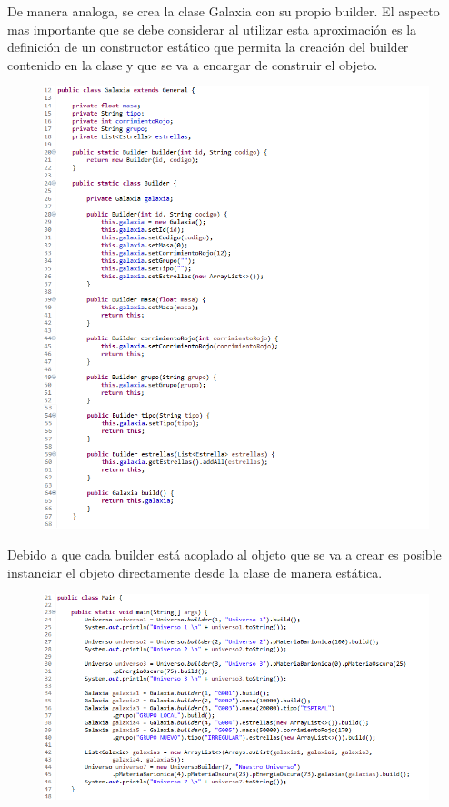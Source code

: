 De manera analoga, se crea la clase Galaxia con su propio builder. El aspecto mas importante que se debe considerar al utilizar esta aproximación es la definición de un constructor estático que permita la creación del builder contenido en la clase y que se va a encargar de construir el objeto.

\begin{figure}[H]
	\includegraphics{images/creational/builder/builderExample14.png}
\end{figure}

Debido a que cada builder está acoplado al objeto que se va a crear es posible instanciar el objeto directamente desde la clase de manera estática.

\begin{figure}[H]
	\includegraphics{images/creational/builder/builderExample15.png}
\end{figure}

